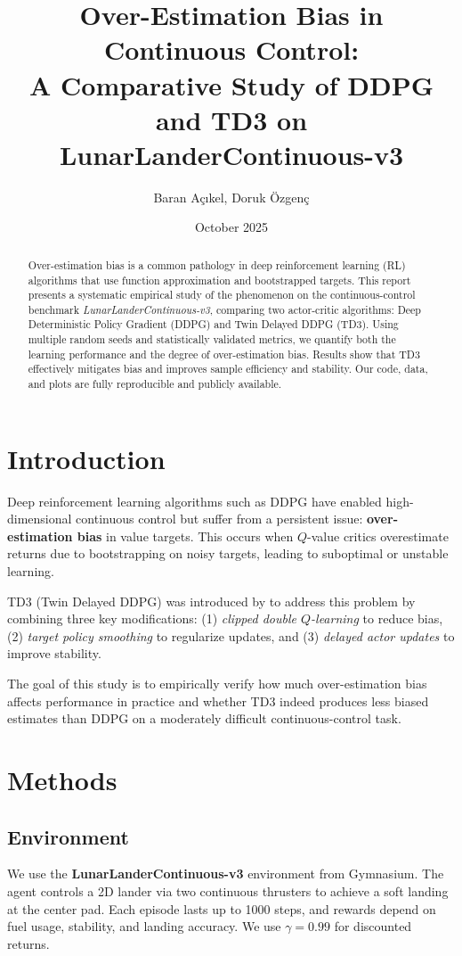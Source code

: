 \documentclass[10pt,letterpaper]{article}
\title{Over-Estimation Bias in Continuous Control: \\A Comparative Study of DDPG and TD3 on LunarLanderContinuous-v3}
\author{Baran Açıkel, Doruk Özgenç}
\date{October 2025}
\begin{document}
\maketitle

\begin{abstract}
Over-estimation bias is a common pathology in deep reinforcement learning (RL) algorithms that use function approximation and bootstrapped targets. This report presents a systematic empirical study of the phenomenon on the continuous-control benchmark \textit{LunarLanderContinuous-v3}, comparing two actor-critic algorithms: Deep Deterministic Policy Gradient (DDPG) and Twin Delayed DDPG (TD3). Using multiple random seeds and statistically validated metrics, we quantify both the learning performance and the degree of over-estimation bias. Results show that TD3 effectively mitigates bias and improves sample efficiency and stability. Our code, data, and plots are fully reproducible and publicly available.
\end{abstract}

\section{Introduction}
Deep reinforcement learning algorithms such as DDPG have enabled high-dimensional continuous control but suffer from a persistent issue: \textbf{over-estimation bias} in value targets. This occurs when $Q$-value critics overestimate returns due to bootstrapping on noisy targets, leading to suboptimal or unstable learning. 

TD3 (Twin Delayed DDPG) was introduced by \cite{fujimoto2018} to address this problem by combining three key modifications: (1) \textit{clipped double $Q$-learning} to reduce bias, (2) \textit{target policy smoothing} to regularize updates, and (3) \textit{delayed actor updates} to improve stability. 

The goal of this study is to empirically verify how much over-estimation bias affects performance in practice and whether TD3 indeed produces less biased estimates than DDPG on a moderately difficult continuous-control task.

\section{Methods}
\subsection{Environment}
We use the \textbf{LunarLanderContinuous-v3} environment from Gymnasium. The agent controls a 2D lander via two continuous thrusters to achieve a soft landing at the center pad. Each episode lasts up to 1000 steps, and rewards depend on fuel usage, stability, and landing accuracy. We use $\gamma = 0.99$ for discounted returns.
\end{document}
